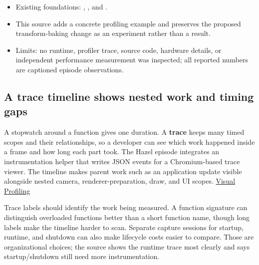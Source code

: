 \begin{itemize}
\tightlist
\item
  Existing foundations: , , and .
\item
  This source adds a concrete profiling example and preserves the proposed transform-baking change as an experiment rather than a result.
\item
  Limits: no runtime, profiler trace, source code, hardware details, or independent performance measurement was inspected; all reported numbers are captioned episode observations.
\end{itemize}

\subsection{A trace timeline shows nested work and timing gaps}\label{06-engine-ii-ch041-a-trace-timeline-shows-nested-work-and-timing-gaps}

\hypertarget{06-engine-ii-ch041-a-trace-timeline-shows-nested-work-and-timing-gaps}{}

A stopwatch around a function gives one duration. A \textbf{trace} keeps many timed scopes and their relationships, so a developer can see which work happened inside a frame and how long each part took. The Hazel episode integrates an instrumentation helper that writes JSON events for a Chromium-based trace viewer. The timeline makes parent work such as an application update visible alongside nested camera, renderer-preparation, draw, and UI scopes. \href{https://www.youtube.com/watch?v=qiD39bB7DvA}{Visual Profiling}

Trace labels should identify the work being measured. A function signature can distinguish overloaded functions better than a short function name, though long labels make the timeline harder to scan. Separate capture sessions for startup, runtime, and shutdown can also make lifecycle costs easier to compare. Those are organizational choices; the source shows the runtime trace most clearly and says startup/shutdown still need more instrumentation.

